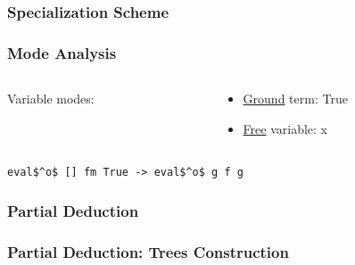 \documentclass[xcolor=table, aspectratio=169]{beamer}
\begin{document}
\begin{frame}[fragile]
  \frametitle{Specialization Scheme}
  \begin{center}
    
  \end{center}
\end{frame}

\begin{frame}[fragile]
  \frametitle{Mode Analysis}
  \begin{center}
    \begin{minipage}{0.5\textwidth}
      \begin{columns}[T]
        \begin{column}{0.1\textwidth}
          Variable modes: 
        \end{column}
        \begin{column}{0.6\textwidth}
         \begin{minipage}{\textwidth}
            \begin{itemize}
                \item \underline{Ground} term: True
                \item \underline{Free} variable: x
            \end{itemize}
          \end{minipage}
        \end{column}
    \end{columns}
  \end{minipage}
  \end{center}

\vspace{0.3cm}
  
  \begin{center}
    \lstinline{eval$^o$ [] fm True -> eval$^o$ g f g}
    
    
  \end{center}

\end{frame}

\begin{frame}[fragile]
  \frametitle{Partial Deduction}

  
\end{frame}


\begin{frame}[fragile]
  \frametitle{Partial Deduction: Trees Construction}

  
\end{frame}
\end{document}
